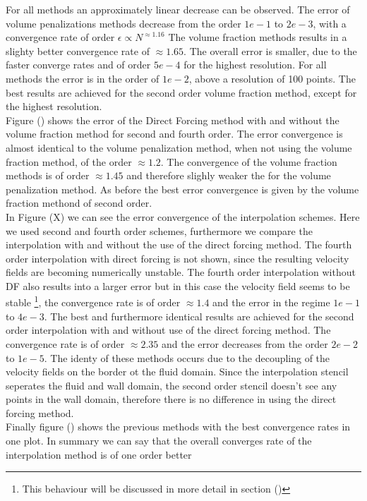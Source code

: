 For all methods an approximately linear decrease  can be observed.
The error of volume penalizations methods decrease from the order $1e-1$ to $2e-3$, with
a convergence rate of order  $\epsilon \propto N^{\approx1.16}$
The volume fraction methods results in a slighty better convergence rate of $\approx 1.65$.
The overall error is smaller, due to the faster converge rates and of order $5e-4$ for the
highest resolution. For all methods the error is in the order of $1e-2$, above a resolution of 100 points.
The best results are achieved for the second order volume fraction method, except for the highest resolution.\\
Figure () shows the error of the Direct Forcing method with and without the volume fraction method for second
and fourth order. The error convergence is almost identical to the volume penalization method, when not using the volume
fraction method, of the order $\approx 1.2$. The convergence of the volume fraction methods is of order $\approx 1.45$
and therefore slighly weaker the for the volume penalization method.
As before the best error convergence is given by the volume fraction methond of second order.\\
In Figure (X) we can see the error convergence of the interpolation schemes.
Here we used second and fourth order schemes, furthermore we compare the interpolation with and without the
use of the direct forcing method.
The fourth order interpolation with direct forcing is not shown, since the resulting velocity fields are becoming
numerically unstable. The fourth order interpolation without DF also results into a larger error but in this case
the velocity field seems to be stable \footnote{This behaviour will be discussed in more detail in section ()}, the
convergence rate is of order $\approx 1.4$ and the error in the regime $1e-1$ to $4e-3$.
The best and furthermore identical results are achieved for the second order interpolation with and without
use of the direct forcing method. The convergence rate is of order $\approx 2.35$ and the error
decreases from the order $2e-2$ to $1e-5$. The identy of these methods occurs due to the decoupling of the velocity fields
on the border ot the fluid domain. Since the interpolation stencil seperates the fluid and wall domain, the second order
stencil doesn't see any points in the wall domain, therefore there is no difference in using the direct forcing method.\\
Finally figure () shows the previous methods with the best convergence rates in one plot.
In summary we can say that the overall converges rate of the interpolation method is of one order better
